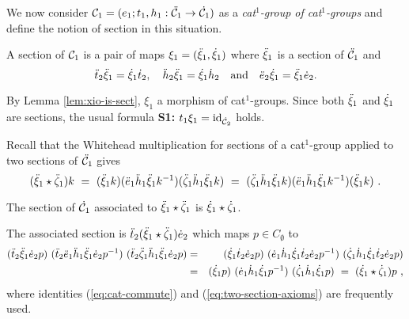 We now consider $\mathcal{C}_1 = (e_1;t_1,h_1 : \ddot{\mathcal{C}}_1 \to \dot{\mathcal{C}}_1)$ 
as a \emph{cat$^1$-group of cat$^1$-groups} and define the
notion of section in this situation.

\begin{defn}
A section of $\mathcal{C}_1$ is a pair of maps $\xi_1 = (\ddot{\xi}_1,\dot{\xi}_1)$ 
where $\ddot{\xi}_1$ is a section of $\ddot{\mathcal{C}}_1$ and
\begin{equation} \label{eq:two-section-axioms}
\ddot{t}_2\ddot{\xi}_1 = \dot{\xi}_1\dot{t}_2, \quad 
\ddot{h}_2\ddot{\xi}_1 = \dot{\xi}_1\dot{h}_2  \quad\mbox{and}\quad
\ddot{e}_2\dot{\xi}_1 = \ddot{\xi}_1\dot{e}_2.
\end{equation}
\end{defn}

\noindent
By Lemma \ref{lem:xio-is-sect}, $\xi_1$ a morphism of cat$^1$-groups.  
Since both $\ddot{\xi}_1$ and $\dot{\xi}_1$ are sections, 
the usual formula {\bf S1:} $t_1\xi_1 = \mathrm{id}_{\dot{\mathcal{C}}_2}$ holds.

\bigskip
Recall that the Whitehead multiplication for sections of a 
cat$^1$-group applied to two sections of $\ddot{\mathcal{C}}_1$ gives 
$$
(\ddot{\xi}_1 \star {\ddot{\zeta}_1})k
 ~=~ (\ddot{\xi}_1 k)(\ddot{e}_1\ddot{h}_1\ddot{\xi}_1 k^{-1})({\ddot{\zeta}_1}\ddot{h}_1\ddot{\xi}_1 k)
 ~=~ ({\ddot{\zeta}_1}\ddot{h}_1\ddot{\xi}_1 k)(\ddot{e}_1\ddot{h}_1\ddot{\xi}_1 k^{-1})(\ddot{\xi}_1 k)~.
$$


\begin{lem}
The section of $\dot{\mathcal{C}}_1$ associated to $\ddot{\xi}_1 \star {\ddot{\zeta}_1}$ 
is $\dot{\xi}_1 \star {\dot{\zeta}_1}$.
\end{lem}
\begin{pf}
The associated section is 
$\ddot{t}_2(\ddot{\xi}_1 \star {\ddot{\zeta}_1})\dot{e}_2$ which maps $p \in C_{\emptyset}$ to
\begin{eqnarray*}
(\ddot{t}_2\ddot{\xi}_1\dot{e}_2 p)~(\ddot{t}_2\ddot{e}_1\ddot{h}_1\ddot{\xi}_1\dot{e}_2 p^{-1})~
(\ddot{t}_2{\ddot{\zeta}_1}\ddot{h}_1\ddot{\xi}_1\dot{e}_2 p) 
& = & 
(\dot{\xi}_1\dot{t}_2\dot{e}_2 p)~(\dot{e}_1\dot{h}_1\dot{\xi}_1\dot{t}_2\dot{e}_2 p^{-1})~
({\dot{\zeta}_1}\dot{h}_1\dot{\xi}_1\dot{t}_2\dot{e}_2 p) \\
& = & 
(\dot{\xi}_1 p)~(\dot{e}_1\dot{h}_1\dot{\xi}_1 p^{-1})~({\dot{\zeta}_1}\dot{h}_1\dot{\xi}_1 p) 
~ = ~
(\dot{\xi}_1 \star {\dot{\zeta}_1})p~,
\end{eqnarray*}
where identities (\ref{eq:cat-commute}) and (\ref{eq:two-section-axioms}) 
are frequently used.
\end{pf}

